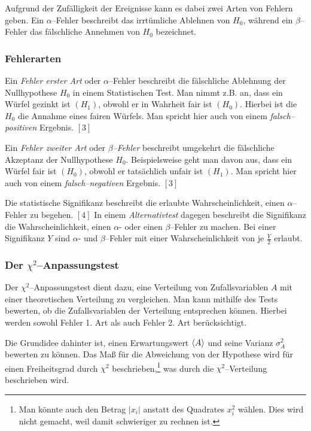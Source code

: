 \documentclass[12pt,a4paper]{scrartcl}
\numberwithin{equation}{section} %
\renewcommand{\[}{} %
\renewcommand{\]}{\noindent} %
\begin{document}
Aufgrund der Zufälligkeit der Ereignisse kann es dabei zwei Arten von
Fehlern geben. Ein \(\alpha\)--Fehler beschreibt das irrtümliche
Ablehnen von \(H_0\), während ein \(\beta\)--Fehler das fälschliche
Annehmen von \(H_0\) bezeichnet.

\hypertarget{fehlerarten}{%
\subsubsection{Fehlerarten}\label{fehlerarten}}

Ein \emph{Fehler erster Art} oder \(\alpha\)--Fehler beschreibt die
fälschliche Ablehnung der Nullhypothese \(H_0\) in einem Statistischen
Test. Man nimmt z.B. an, dass ein Würfel gezinkt ist \((H_1)\), obwohl
er in Wahrheit fair ist \((H_0)\). Hierbei ist die \(H_0\) die Annahme
eines fairen Würfels. Man spricht hier auch von einem
\emph{falsch--positiven} Ergebnis. \([3]\)

Ein \emph{Fehler zweiter Art} oder \emph{\(\beta\)--Fehler} beschreibt
umgekehrt die fälschliche Akzeptanz der Nullhypothese \(H_0\).
Beispielsweise geht man davon aus, dass ein Würfel fair ist \((H_0)\),
obwohl er tatsächlich unfair ist \((H_1)\). Man spricht hier auch von
einem \emph{falsch--negativen} Ergebnis. \([3]\)

Die statistische Signifikanz beschreibt die erlaubte Wahrscheinlichkeit,
einen \(\alpha\)--Fehler zu begehen. \([4]\) In einem
\emph{Alternativtest} dagegen beschreibt die Signifikanz die
Wahrscheinlichkeit, einen \(\alpha\)- oder einen \(\beta\)--Fehler zu
machen. Bei einer Signifikanz \(Y\) sind \(\alpha\)- und
\(\beta\)--Fehler mit einer Wahrscheinlichkeit von je \(\frac{Y}{2}\)
erlaubt.

\hypertarget{der-chi2anpassungstest}{%
\subsubsection{\texorpdfstring{Der
\(\chi^2\)--Anpassungstest}{Der \textbackslash chi\^{}2--Anpassungstest}}\label{der-chi2anpassungstest}}

Der \(\chi^2\)--Anpassungstest dient dazu, eine Verteilung von
Zufallsvariablen \(A\) mit einer theoretischen Verteilung zu
vergleichen. Man kann mithilfe des Tests bewerten, ob die
Zufallsvariablen der Verteilung entsprechen können. Hierbei werden
sowohl Fehler 1. Art als auch Fehler 2. Art berücksichtigt.

Die Grundidee dahinter ist, einen Erwartungswert \(\expval{A}\) und
seine Varianz \(\sigma_A^2\) bewerten zu können. Das Maß für die
Abweichung von der Hypothese wird für einen Freiheitsgrad durch
\(\chi^2\) beschrieben,\footnote{Man könnte auch den Betrag \(|x_i|\)
  anstatt des Quadrates \(x_i^2\) wählen. Dies wird nicht gemacht, weil
  damit schwieriger zu rechnen ist.} was durch die
\(\chi^2\)--Verteilung beschrieben wird.
\end{document}
